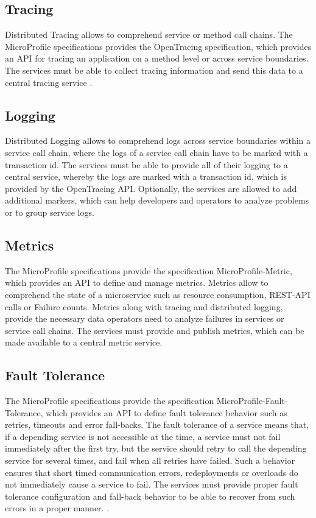 \subsection{Tracing}
\label{sec:esboc-aspects-tracing}
Distributed Tracing allows to comprehend service or method call chains. The MicroProfile specifications provides the OpenTracing specification, which provides an API for tracing an application on a method level or across service boundaries. The services must be able to collect tracing information and send this data to a central tracing service \cite{CNCFOpentracing2018}.

\subsection{Logging}
\label{sec:esboc-aspects-logging}
Distributed Logging allows to comprehend logs across service boundaries within a service call chain, where the logs of a service call chain have to be marked with a transaction id. The services must be able to provide all of their logging to a central service, whereby the logs are marked with a transaction id, which is provided by the OpenTracing API. Optionally, the services are allowed to add additional markers, which can help developers and operators to analyze problems or to group service logs.

\subsection{Metrics}
\label{sec:esboc-aspects-metrics}
The MicroProfile specifications provide the specification MicroProfile-Metric, which provides an API to define and manage metrics. Metrics allow to comprehend the state of a microservice such as resource consumption, REST-API calls or Failure counts. Metrics along with tracing and distributed logging, provide the necessary data operators need to analyze failures in services or service call chains. The services must provide and publish metrics, which can be made available to a central metric service.

\subsection{Fault Tolerance}
\label{sec:esboc-requirements-service-fault}
The MicroProfile specifications provide the specification MicroProfile-Fault-Tolerance, which provides an API to define fault tolerance behavior such as retries, timeouts and error fall-backs. The fault tolerance of a service means that, if a depending service is not accessible at the time, a service must not fail immediately after the first try, but the service should retry to call the depending service for several times, and fail when all retries have failed. Such a behavior ensures that short timed communication errors, redeployments or overloads do not immediately cause a service to fail. The services must provide proper fault tolerance configuration and fall-back behavior to be able to recover from such errors in a proper manner. \cite{EclipseMicroprofileFault2018}.   

